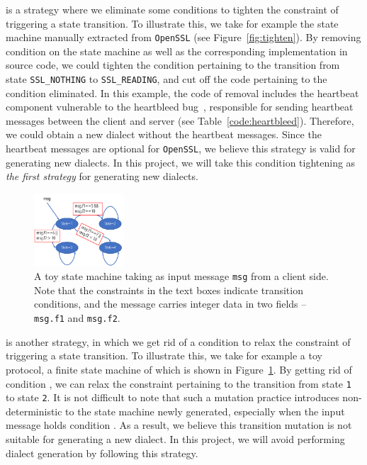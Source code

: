  is a strategy where we
eliminate  some conditions to tighten the constraint of triggering a state
transition. To illustrate this, we take for example the state machine manually
extracted from \texttt{OpenSSL} (see Figure~\ref{fig:tighten}). By removing
condition  on the state machine as well as
the corresponding implementation in source code, we could tighten the condition
pertaining to the transition from state \texttt{SSL\_NOTHING} to
\texttt{SSL\_READING}, and cut off the code pertaining to the condition
eliminated. In this example, the code of removal includes the heartbeat
component vulnerable to the heartbleed bug~\citep{}, responsible for sending
heartbeat messages between the client and server (see
Table~\ref{code:heartbleed}). Therefore, we could obtain a new dialect without
the heartbeat messages. Since the heartbeat messages are optional for
\texttt{OpenSSL}, we believe this strategy is valid for generating new dialects.
In this project, we will take this condition tightening as \emph{the first
strategy} for generating new dialects.

\begin{figure}
  \centering
  \includegraphics[width=0.3\textwidth]{figure/toy}
  \caption{A toy state machine taking as input message \texttt{msg} from a
  client side. Note that the constraints in the text boxes indicate transition
  conditions, and the message carries integer data in two fields --
  \texttt{msg.f1} and \texttt{msg.f2}.}
  \label{fig:toy_fsm}
\end{figure}

 is another strategy,  in
which we get rid of a condition to relax the constraint of triggering a state
transition. To illustrate this, we take for example a toy protocol, a finite
state machine of which is shown in Figure~\ref{fig:toy_fsm}. By getting rid of
condition , we can relax the constraint pertaining to the
transition from state \texttt{1} to state \texttt{2}. It is not difficult to
note that such a mutation practice introduces non-deterministic to the state
machine newly generated, especially when the input message holds condition
. As a result, we believe this transition
mutation is not suitable for generating a new dialect. In this project, we will
avoid performing dialect generation by following this strategy.

